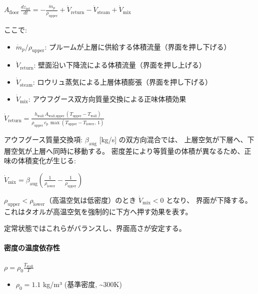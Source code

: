 \documentclass[a4paper,11pt]{article}
\begin{document}
$
A_{\text{floor}} \, \frac{dz_{\text{int}}}{dt}
= -\frac{\dot{m}_p}{\rho_{\text{upper}}} + \dot{V}_{\text{return}} - \dot{V}_{\text{steam}} + \dot{V}_{\text{mix}}
$

ここで:

\begin{itemize} \item $\dot{m}_p / \rho_{\text{upper}}$: プルームが上層に供給する体積流量（界面を押し下げる） \end{itemize}
\begin{itemize} \item $\dot{V}_{\text{return}}$: 壁面沿い下降流による体積流量（界面を押し上げる） \end{itemize}
\begin{itemize} \item $\dot{V}_{\text{steam}}$: ロウリュ蒸気による上層体積膨張（界面を押し下げる） \end{itemize}
\begin{itemize} \item $\dot{V}_{\text{mix}}$: アウフグース双方向質量交換による正味体積効果 \end{itemize}

$
\dot{V}_{\text{return}} = \frac{h_{\text{wall}} \, A_{\text{wall,upper}} \, (T_{\text{upper}} - T_{\text{wall}})}{\rho_{\text{upper}} \, c_p \, \max(T_{\text{upper}} - T_{\text{lower}}, \, 1)}
$

アウフグース質量交換項: $\beta_{\text{aug}}$ [kg/s] の双方向混合では、
上層空気が下層へ、下層空気が上層へ同時に移動する。
密度差により等質量の体積が異なるため、正味の体積変化が生じる:

$
\dot{V}_{\text{mix}} = \beta_{\text{aug}} \left( \frac{1}{\rho_{\text{lower}}} - \frac{1}{\rho_{\text{upper}}} \right)
$

$\rho_{\text{upper}} < \rho_{\text{lower}}$（高温空気は低密度）のとき $\dot{V}_{\text{mix}} < 0$ となり、
界面が下降する。これはタオルが高温空気を強制的に下方へ押す効果を表す。

定常状態ではこれらがバランスし、界面高さが安定する。

\paragraph{密度の温度依存性}

$
\rho = \rho_0 \frac{T_{\text{wall}}}{T}
$

\begin{itemize} \item $\rho_0 = 1.1$ kg/m³ (基準密度, \textasciitilde{}300K) \end{itemize}
\end{document}
